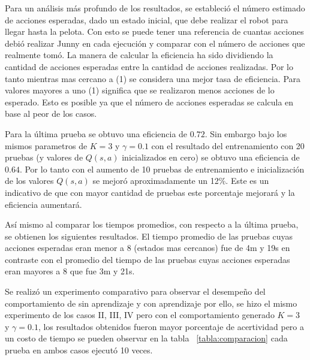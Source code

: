 Para un análisis más profundo de los resultados, se estableci\'o el n\'umero estimado de acciones esperadas, dado un estado inicial, que debe realizar el robot para llegar hasta la pelota. Con esto se puede tener una referencia de cuantas acciones debió realizar Junny en cada ejecución y comparar con el número de acciones que realmente tomó. La manera de calcular la eficiencia ha sido dividiendo la cantidad de acciones esperadas entre la cantidad de acciones realizadas. Por lo tanto mientras mas cercano a (1) se considera una mejor tasa de eficiencia. Para valores mayores a uno (1) significa que se realizaron menos acciones de lo esperado. Esto es posible ya que el número de acciones esperadas se calcula en base al peor de los casos.  

Para la última prueba se obtuvo una eficiencia de $0.72$. Sin embargo bajo los mismos parametros de $K = 3$ y $ \gamma = 0.1 $ con el resultado del entrenamiento con 20 pruebas (y valores de $Q(s,a)$ inicializados en cero) se obtuvo una eficiencia de $0.64$. Por lo tanto con el aumento de 10 pruebas de entrenamiento e inicialización de los valores $Q(s,a)$ se mejoró aproximadamente un 12\%. Este es un indicativo de que con mayor cantidad de pruebas este porcentaje mejorar\'a y la eficiencia aumentará.

Así mismo al comparar los tiempos promedios, con respecto a la última prueba, se obtienen los siguientes resultados. El tiempo promedio de las pruebas cuyas acciones esperadas eran menor a 8 (estados mas cercanos) fue de 4m y 19s en contraste con el promedio del tiempo de las pruebas cuyas acciones esperadas eran mayores a 8 que fue 3m y 21s.

Se realiz\'o un experimento comparativo para observar el desempe\~no del comportamiento de sin aprendizaje y con aprendizaje por ello, se hizo el mismo experimento de los casos II, III, IV pero con el comportamiento generado $K = 3 $ y $ \gamma = 0.1$,  los resultados obtenidos fueron mayor porcentaje de acertividad pero a un costo de tiempo se pueden observar en la tabla ~\ref{tabla:comparacion}  cada prueba en ambos casos ejecut\'o 10 veces.

